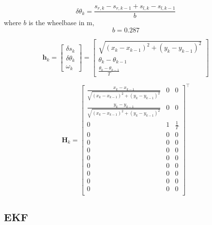 \documentclass{ieeeaccess}
\begin{document}
	\begin{equation}
	\label{eq:deltth}
		\delta \theta_{k} = \frac{s_{r,k} - s_{r,k-1} + s_{l,k} - s_{l,k-1}}{b}
	\end{equation}
	where $b$ is the wheelbase in m,
	\begin{equation}
	\label{eq:b}
		b = 0.287
	\end{equation}
	
	\begin{equation}
	\label{eq:hsys}
		\boldsymbol{h}_{ k} =
		\begin{bmatrix}
			\delta s_{k} 		\\
			\delta\theta_{k}	\\
			\omega_{k}
		\end{bmatrix}
		=
		\begin{bmatrix}
			\sqrt{\left(x_{k} - x_{k-1}\right)^{2} + \left(y_{k} - y_{k-1}\right)^{2}}	\\
			\theta_{k} - \theta_{k-1}								\\
			\frac{\theta_{k}-\theta_{k-1}}{T}
		\end{bmatrix}
	\end{equation}
	
	\begin{equation}
	\label{eq:Hsys}
		\boldsymbol{H}_{k}	=
		\begin{bmatrix}
			\frac{x_{k}-x_{k-1}}{\sqrt{\left( x_{k} - x_{k-1} \right)^{2}+\left( y_{k} - y_{k-1} \right)^{2}}}	&0	&0		\\
			\frac{y_{k}-y_{k-1}}{\sqrt{\left( x_{k} - x_{k-1} \right)^{2}+\left( y_{k} - y_{k-1} \right)^{2}}}	&0	&0		\\
			0															&1	&\frac{1}{T}	\\
			0															&0	&0		\\
			0															&0	&0		\\
			0															&0	&0		\\
			0															&0	&0		\\
			0															&0	&0		\\
			0															&0	&0		\\
			0															&0	&0		\\
			0															&0	&0		\\
		\end{bmatrix}^{\top}
	\end{equation}
	
\subsection{EKF}
\end{document}
